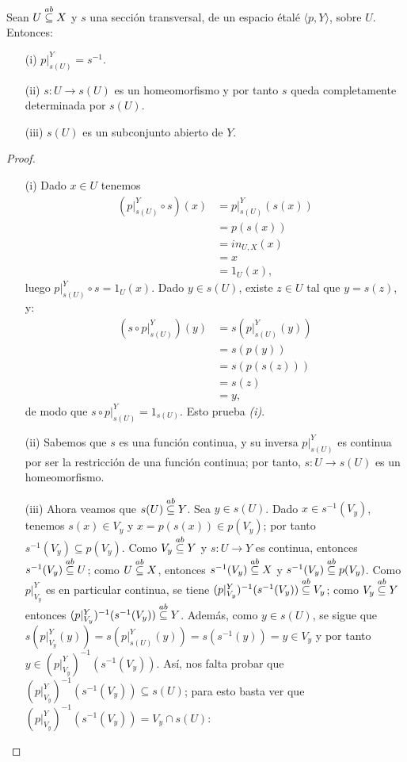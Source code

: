 \begin{Prop}
   Sean $U\stackrel{ab}{\subseteq} X$ y $s$ una sección transversal, de un espacio étalé $\langle p, Y\rangle$, sobre $U$. Entonces:
   \begin{itemize}
      \item[(i)] $p|^{Y}_{s(U)}=s^{-1}$.
      \item[(ii)] $s:U\to s(U)$ es un homeomorfismo y por tanto $s$ queda completamente determinada por $s(U)$.
      \item[(iii)] $s(U)$ es un subconjunto abierto de $Y$.
   \end{itemize}
\end{Prop}
\begin{proof}
   \begin{itemize}
      \item[(i)] Dado $x\in U$ tenemos
         $$
         \begin{aligned}
            (p|^Y_{s(U)}\circ s)(x)&=p|^Y_{s(U)}(s(x))\\
                                   &=p(s(x))\\
                                   &=in_{U,X}(x)\\
                                   &=x\\
                                   &=1_U(x),
         \end{aligned}
         $$
         luego $p|^Y_{s(U)}\circ s=1_U(x)$. Dado $y\in s(U)$, existe $z\in U$ tal que $y=s(z)$, y:
         $$
         \begin{aligned}
            (s\circ p|^Y_{s(U)})(y)&=s(p|^Y_{s(U)}(y))\\
                                  &=s(p(y))\\
                                  &=s(p(s(z)))\\
                                  &=s(z)\\
                                  &=y,
         \end{aligned}
         $$
         de modo que $s\circ p|^{Y}_{s(U)}=1_{s(U)}$. Esto prueba \textit{(i)}.
      \item[(ii)] Sabemos que $s$ es una función continua, y su inversa $p|^Y_{s(U)}$ es continua por ser la restricción de una función continua; por tanto, $s:U\to s(U)$ es un homeomorfismo.
   \item[(iii)] Ahora veamos que $s(U)\stackrel{ab}{\subseteq} Y$. Sea $y\in s(U)$. Dado $x\in s^{-1}(V_y)$, tenemos $s(x)\in V_y$ y $x=p(s(x))\in p(V_y)$; por tanto $s^{-1}(V_y)\subseteq p(V_y)$. Como $V_y\stackrel{ab}{\subseteq} Y$ y $s:U\to Y$ es continua, entonces $s^{-1}(V_y)\stackrel{ab}{\subseteq} U$; como $U\stackrel{ab}{\subseteq} X$, entonces $s^{-1}(V_y)\stackrel{ab}{\subseteq} X$ y $s^{-1}(V_y)\stackrel{ab}{\subseteq} p(V_y)$. Como $p|^Y_{V_y}$ es en particular continua, se tiene $(p|^Y_{V_y})^{-1}(s^{-1}(V_y))\stackrel{ab}{\subseteq} V_y$; como $V_y\stackrel{ab}{\subseteq} Y$ entonces $(p|^Y_{V_y})^{-1}(s^{-1}(V_y))\stackrel{ab}{\subseteq} Y$. Además, como $y\in s(U)$, se sigue que $s(p|^Y_{V_y}(y))=s(p|^Y_{s(U)}(y))=s(s^{-1}(y))=y\in V_y$ y por tanto $y\in (p|^Y_{V_y})^{-1}(s^{-1}(V_y))$. Así, nos falta probar que $(p|^Y_{V_y})^{-1}(s^{-1}(V_y))\subseteq s(U)$; para esto basta ver que $(p|^Y_{V_y})^{-1}(s^{-1}(V_y))=V_y\cap s(U)$:

\end{itemize}
\end{proof}
